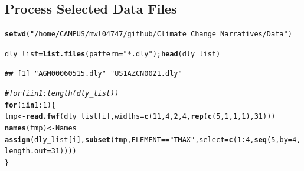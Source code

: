 \documentclass{article}\usepackage[]{graphicx}\usepackage[]{color}
\makeatletter
\newcommand{\hlnum}[1]{\textcolor[rgb]{0.686,0.059,0.569}{#1}}%
\newcommand{\hlstr}[1]{\textcolor[rgb]{0.192,0.494,0.8}{#1}}%
\newcommand{\hlcom}[1]{\textcolor[rgb]{0.678,0.584,0.686}{\textit{#1}}}%
\newcommand{\hlopt}[1]{\textcolor[rgb]{0,0,0}{#1}}%
\newcommand{\hlstd}[1]{\textcolor[rgb]{0.345,0.345,0.345}{#1}}%
\newcommand{\hlkwa}[1]{\textcolor[rgb]{0.161,0.373,0.58}{\textbf{#1}}}%
\newcommand{\hlkwb}[1]{\textcolor[rgb]{0.69,0.353,0.396}{#1}}%
\newcommand{\hlkwc}[1]{\textcolor[rgb]{0.333,0.667,0.333}{#1}}%
\newcommand{\hlkwd}[1]{\textcolor[rgb]{0.737,0.353,0.396}{\textbf{#1}}}%
\newenvironment{kframe}{%
 \def\at@end@of@kframe{}%
 \ifinner\ifhmode%
  \def\at@end@of@kframe{\end{minipage}}%
  \begin{minipage}{\columnwidth}%
 \fi\fi%
 \def\FrameCommand##1{\hskip\@totalleftmargin \hskip-\fboxsep
 \colorbox{shadecolor}{##1}\hskip-\fboxsep
     \hskip-\linewidth \hskip-\@totalleftmargin \hskip\columnwidth}%
 \MakeFramed {\advance\hsize-\width
   \@totalleftmargin\z@ \linewidth\hsize
   \@setminipage}}%
 {\par\unskip\endMakeFramed%
 \at@end@of@kframe}
\newenvironment{knitrout}{}{} %
\makeatother
\begin{document}
\subsection{Process Selected Data Files}

\begin{knitrout}
\color{fgcolor}\begin{kframe}
\begin{alltt}
\hlkwd{setwd}\hlstd{(}\hlstr{"/home/CAMPUS/mwl04747/github/Climate_Change_Narratives/Data"}\hlstd{)}

\hlstd{dly_list} \hlkwb{=} \hlkwd{list.files}\hlstd{(}\hlkwc{pattern}\hlstd{=}\hlstr{"*.dly"}\hlstd{);} \hlkwd{head}\hlstd{(dly_list)}
\end{alltt}
\begin{verbatim}
## [1] "AGM00060515.dly" "US1AZCN0021.dly"
\end{verbatim}
\begin{alltt}
\hlcom{#for (i in 1:length(dly_list)) }
\hlkwa{for} \hlstd{(i} \hlkwa{in} \hlnum{1}\hlopt{:}\hlnum{1}\hlstd{)\{}
\hlstd{tmp} \hlkwb{<-} \hlkwd{read.fwf}\hlstd{(dly_list[i],} \hlkwc{widths} \hlstd{=} \hlkwd{c}\hlstd{(}\hlnum{11}\hlstd{,} \hlnum{4}\hlstd{,} \hlnum{2}\hlstd{,} \hlnum{4}\hlstd{,} \hlkwd{rep}\hlstd{(}\hlkwd{c}\hlstd{(}\hlnum{5}\hlstd{,} \hlnum{1}\hlstd{,} \hlnum{1}\hlstd{,} \hlnum{1}\hlstd{),}\hlnum{31}\hlstd{)))}
\hlkwd{names}\hlstd{(tmp)} \hlkwb{<-} \hlstd{Names}
\hlkwd{assign}\hlstd{(dly_list[i],} \hlkwd{subset}\hlstd{(tmp, ELEMENT}\hlopt{==}\hlstr{"TMAX"}\hlstd{,} \hlkwc{select}\hlstd{=}\hlkwd{c}\hlstd{(}\hlnum{1}\hlopt{:}\hlnum{4}\hlstd{,} \hlkwd{seq}\hlstd{(}\hlnum{5}\hlstd{,} \hlkwc{by} \hlstd{=} \hlnum{4}\hlstd{,} \hlkwc{length.out}\hlstd{=}\hlnum{31}\hlstd{))))}
\hlstd{\}}



\end{alltt}
\end{kframe}
\end{knitrout}
\end{document}

